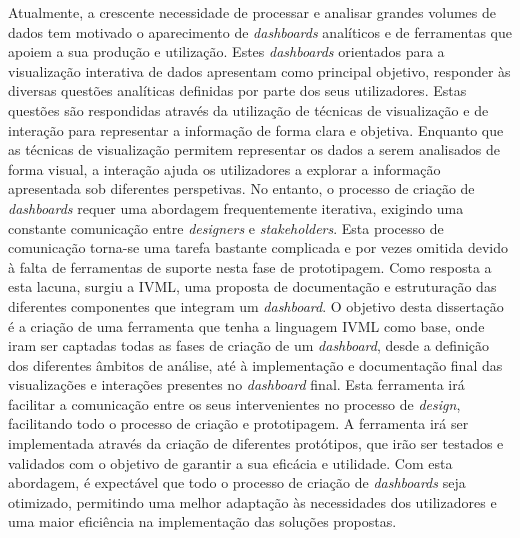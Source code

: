 
%

Atualmente, a crescente necessidade de processar e analisar grandes volumes de dados tem motivado o aparecimento de \textit{dashboards} analíticos e de ferramentas que apoiem a sua produção e utilização. Estes \textit{dashboards} orientados para a visualização interativa de dados apresentam como principal objetivo, responder às diversas questões analíticas definidas por parte dos seus utilizadores. Estas questões são respondidas através da utilização de técnicas de visualização e de interação para representar a informação de forma clara e objetiva. Enquanto que as técnicas de visualização permitem representar os dados a serem analisados de forma visual, a interação ajuda os utilizadores a explorar a informação apresentada sob diferentes perspetivas. No entanto, o processo de criação de \textit{dashboards} requer uma abordagem frequentemente iterativa, exigindo uma constante comunicação entre \textit{designers} e \textit{stakeholders}. Esta processo de comunicação torna-se uma tarefa bastante complicada e por vezes omitida devido à falta de ferramentas de suporte nesta fase de prototipagem. Como resposta a esta lacuna, surgiu a \gls{IVML}, uma proposta de documentação e estruturação das diferentes componentes que integram um \textit{dashboard}. O objetivo desta dissertação é a criação de uma ferramenta que tenha a linguagem \gls{IVML} como base, onde iram ser captadas todas as fases de criação de um \textit{dashboard}, desde a definição dos diferentes âmbitos de análise, até à implementação e documentação final das visualizações e interações presentes no \textit{dashboard} final. Esta ferramenta irá facilitar a comunicação entre os seus intervenientes no processo de \textit{design}, facilitando todo o processo de criação e prototipagem. A ferramenta irá ser implementada através da criação de diferentes protótipos, que irão ser testados e validados com o objetivo de garantir a sua eficácia e utilidade. Com esta abordagem, é expectável que todo o processo de criação de \textit{dashboards} seja otimizado, permitindo uma melhor adaptação às necessidades dos utilizadores e uma maior eficiência na implementação das soluções propostas.


